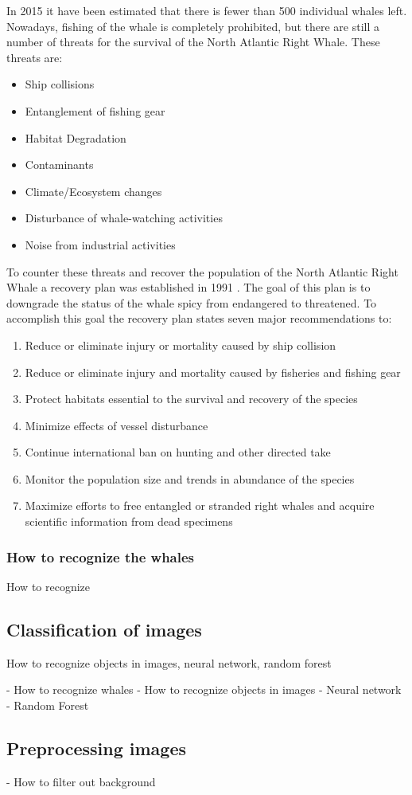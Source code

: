 In 2015 it have been estimated that there is fewer than 500 individual whales left. Nowadays, fishing of the whale is completely prohibited, but there are still a number of threats for the survival of the North Atlantic Right Whale.
These threats are:
\begin{itemize}
	\item Ship collisions 
	\item Entanglement of fishing gear
	\item Habitat Degradation 
	\item Contaminants
	\item Climate/Ecosystem changes
	\item Disturbance of whale-watching activities
	\item Noise from industrial activities
\end{itemize}
To counter these threats and recover the population of the North Atlantic Right Whale a recovery plan was established in 1991 \cite{NOAARecovery}. 
The goal of this plan is to downgrade the status of the whale spicy from endangered to threatened.
To accomplish this goal the recovery plan states seven major recommendations to:
\begin{enumerate}
	\item Reduce or eliminate injury or mortality caused by ship collision
	\item Reduce or eliminate injury and mortality caused by fisheries and fishing gear
	\item Protect habitats essential to the survival and recovery of the species
	\item Minimize effects of vessel disturbance
	\item Continue international ban on hunting and other directed take
	\item Monitor the population size and trends in abundance of the species
	\item Maximize efforts to free entangled or stranded right whales and acquire scientific information from dead specimens
\end{enumerate} 

\subsubsection{How to recognize the whales}
How to recognize

\subsection{Classification of images}
How to recognize objects in images, neural network, random forest

- How to recognize whales
- How to recognize objects in images
	- Neural network
	- Random Forest

\subsection{Preprocessing images}

- How to filter out background